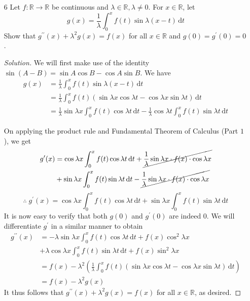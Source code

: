 \documentclass[12pt]{article}
\def\D{\mathrm{d}}
\theoremstyle{definition}
\newenvironment{soln}{\begin{proof}[Solution]}{\end{proof}}
\begin{document}
\begin{enumerate}[leftmargin=*]
    \newpage
    
    \item[6] Let $f \colon \mathbb{R} \rightarrow \mathbb{R}$ be continuous and $\lambda \in \mathbb{R}, \lambda \neq 0$. For $x \in \mathbb{R}$, let
    \[
        g(x) = \frac{1}{\lambda} \int_0^x f(t) \sin{\lambda(x-t)} \, \D t
    \]
    Show that $g^{\prime\prime}(x) + \lambda^2 g(x) = f(x)$ for all $x \in \mathbb{R}$ and $g(0) = g^{\prime}(0) = 0$.
    
    \begin{soln}
        We will first make use of the identity $\sin{(A-B)} = \sin{A}\cos{B} - \cos{A}\sin{B}$. We have
        \begin{align*}
            g(x) &= \frac{1}{\lambda} \int_0^x f(t) \sin{\lambda(x-t)} \, \D t \\
            &= \frac{1}{\lambda} \int_0^x f(t) \left( \sin{\lambda x} \cos{\lambda t} - \cos{\lambda x} \sin{\lambda t} \right) \, \D t \\
            &= \frac{1}{\lambda} \sin{\lambda x} \int_0^x f(t) \cos{\lambda t} \, \D t - \frac{1}{\lambda} \cos{\lambda t} \int_0^x f(t) \sin{\lambda t} \, \D t
        \end{align*}
        
        On applying the product rule and Fundamental Theorem of Calculus (Part $1$), we get
        \begin{align*}
            g^{\prime}(x) &= \cos{\lambda x} \int_0^x f(t) \cos{\lambda t} \, \D t + \cancel{\frac{1}{\lambda} \sin{\lambda x} \cdot f(x) \cdot \cos{\lambda x}} \\
            &+ \sin{\lambda x} \int_0^x f(t) \sin{\lambda t} \, \D t - \cancel{ \frac{1}{\lambda} \sin{\lambda x} \cdot f(x) \cdot \cos{\lambda x}}
        \end{align*}
        \[
            \therefore \; g^{\prime}(x) = \cos{\lambda x} \int_0^x f(t) \cos{\lambda t} \, \D t + \sin{\lambda x} \int_0^x f(t) \sin{\lambda t} \, \D t
        \]
        It is now easy to verify that both $g(0)$ and $g^{\prime}(0)$ are indeed $0$. We will differentiate $g^{\prime}$ in a similar manner to obtain
        \begin{align*}
            g^{\prime \prime}(x) &= -\lambda \sin{\lambda x} \int_0^x f(t) \cos{\lambda t} \, \D t + f(x) \cos^2{\lambda x} \\
            &+ \lambda \cos{\lambda x} \int_0^x f(t) \sin{\lambda t} \, \D t + f(x) \sin^2{\lambda x} \\
            &= f(x) - \lambda^2 \left( \frac{1}{\lambda} \int_0^x f(t) \left( \sin{\lambda x} \cos{\lambda t} - \cos{\lambda x} \sin{\lambda t} \right) \, \D t\right) \\
            &= f(x) - \lambda^2 g(x)
        \end{align*}
        It thus follows that $g^{\prime\prime}(x) + \lambda^2 g(x) = f(x)$ for all $x \in \mathbb{R}$, as desired.
    \end{soln}
\end{enumerate}
    
\end{document}
